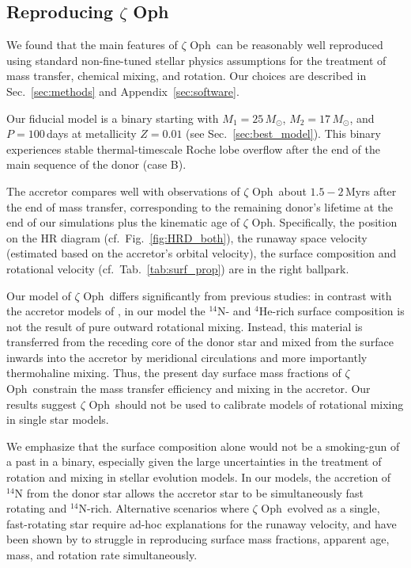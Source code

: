 \documentclass[twocolumn,twocolappendix,trackchanges]{aastex63}
\DeclareRobustCommand{\Figref}[1]{Fig.~\ref{#1}}
\DeclareRobustCommand{\Tabref}[1]{Tab.~\ref{#1}}
\DeclareRobustCommand{\Secref}[1]{Sec.~\ref{#1}}
\newcommand{\zoph}{$\zeta$ Oph}
\begin{document}
\subsection{Reproducing \zoph}

We found that the main features of \zoph\ can be
reasonably well reproduced using standard non-fine-tuned stellar physics
assumptions for the treatment of mass transfer, chemical mixing, and
rotation. Our choices are described in \Secref{sec:methods} and
Appendix~\ref{sec:software}.

Our fiducial model is a binary starting
with $M_1=25\,M_\odot$, $M_2=17\,M_\odot$, and $P=100$\,days at
metallicity $Z=0.01$ (see \Secref{sec:best_model}). This binary
experiences stable thermal-timescale Roche lobe overflow after the end
of the main sequence of the donor (case B).

The accretor compares well with observations of \zoph\ about
$1.5-2$\,Myrs after the end of mass transfer, corresponding to the
remaining donor's lifetime at the end of our simulations plus the
kinematic age of \zoph. Specifically, the position on the HR diagram
(cf.~\Figref{fig:HRD_both}), the runaway space velocity (estimated
based on the accretor's orbital velocity), the surface composition and
rotational velocity (cf.~\Tabref{tab:surf_prop}) are in the right
ballpark.

Our model of \zoph\ differs significantly from previous studies: in
contrast with the accretor models of \cite{vanrensbergen:96}, in our
model the $^{14}\mathrm{N}$- and $^4\mathrm{He}$-rich surface
composition is not the result of pure outward rotational mixing.
Instead, this material is transferred from the receding core of the
donor star and mixed from the surface inwards into the accretor by
meridional circulations and more importantly thermohaline mixing.
Thus, the present day surface mass fractions of \zoph\
constrain the mass transfer efficiency and mixing in the accretor. Our
results suggest \zoph\ should not be used to calibrate models of
rotational mixing in single star models.

We emphasize that the surface composition alone would not be a
smoking-gun of a past in a binary, especially given the large
uncertainties in the treatment of rotation and mixing in stellar
evolution models. In our models, the accretion of $^{14}\mathrm{N}$
from the donor star allows the accretor star to be simultaneously fast
rotating and $^{14}\mathrm{N}$-rich. Alternative scenarios where
\zoph\ evolved as a single, fast-rotating star require ad-hoc
explanations for the runaway velocity, and have been shown by
 to struggle in reproducing surface mass
fractions, apparent age, mass, and rotation rate simultaneously.
\end{document}
